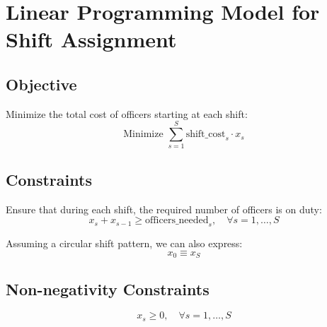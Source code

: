 \documentclass{article}
\begin{document}
\section*{Linear Programming Model for Shift Assignment}

\subsection*{Objective}
Minimize the total cost of officers starting at each shift:
\[
\text{Minimize } \sum_{s=1}^{S} \text{shift\_cost}_{s} \cdot x_s
\]

\subsection*{Constraints}
Ensure that during each shift, the required number of officers is on duty:
\[
x_s + x_{s-1} \geq \text{officers\_needed}_{s}, \quad \forall s = 1, \ldots, S
\]

Assuming a circular shift pattern, we can also express:
\[
x_0 \equiv x_S
\]

\subsection*{Non-negativity Constraints}
\[
x_s \geq 0, \quad \forall s = 1, \ldots, S
\]
\end{document}
